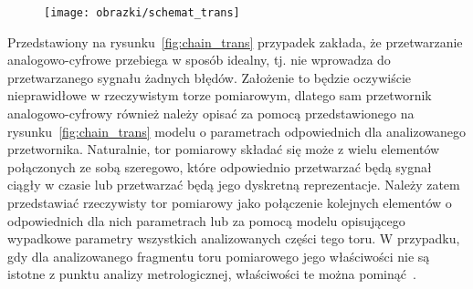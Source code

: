 \begin{figure}[htb!]
\begin{center}
\texttt{[image: obrazki/schemat\_trans]}
\end{center}
\end{figure}

Przedstawiony na rysunku~\ref{fig:chain_trans} przypadek zakłada, że przetwarzanie analogowo-cyfrowe przebiega w sposób idealny, tj. nie wprowadza do przetwarzanego sygnału żadnych błędów. Założenie to będzie oczywiście nieprawidłowe w rzeczywistym torze pomiarowym, dlatego sam przetwornik analogowo-cyfrowy również należy opisać za pomocą przedstawionego na rysunku~\ref{fig:chain_trans} modelu o parametrach odpowiednich dla analizowanego przetwornika. Naturalnie, tor pomiarowy składać się może z wielu elementów połączonych ze sobą szeregowo, które odpowiednio przetwarzać będą sygnał ciągły w czasie lub przetwarzać będą jego dyskretną reprezentacje. Należy zatem przedstawiać rzeczywisty tor pomiarowy jako połączenie kolejnych elementów o odpowiednich dla nich parametrach lub za pomocą modelu opisującego wypadkowe parametry wszystkich analizowanych części tego toru. W przypadku, gdy dla analizowanego fragmentu toru pomiarowego jego właściwości nie są istotne z punktu analizy metrologicznej, właściwości te można pominąć~\cite{jcgm_guide}.

